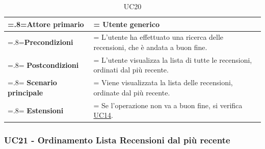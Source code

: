             \begin{table}[H]
                \centering
                \renewcommand{\arraystretch}{1.8}
                \renewcommand\tabularxcolumn[1]{m{#1}}
                \begin{tabularx}{0.9\textwidth} {
                    >{\hsize=.8\hsize\linewidth=\hsize}X
                    >{\hsize=1.2\hsize\linewidth=\hsize}X}
                    \hline
                    \textbf{Attore primario} & Utente generico \\
                    \hline
                    \textbf{Precondizioni} & L'utente ha effettuato una ricerca delle recensioni, che è andata a buon fine. \\
                    \hline
                    \textbf{Postcondizioni} & L'utente visualizza la lista di tutte le recensioni, ordinati dal più recente. \\
                    \hline
                    \textbf{Scenario principale} & Viene visualizzata la lista delle recensioni, ordinate dal più recente. \\
                    \hline
                    \textbf{Estensioni} & Se l'operazione non va a buon fine, si verifica \hyperref[UC14]{UC14}. \\
                    \hline
                \end{tabularx}
                \caption{UC20}
            \end{table}

            \subsubsection{UC21 - Ordinamento Lista Recensioni dal più recente}
            \label{UC21}

